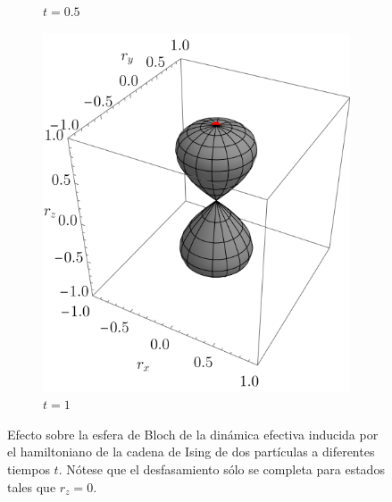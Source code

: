 \begin{figure}[ht!]
\begin{subfigure}{0.32\textwidth}
      \caption{$t=0.5$}
    \end{subfigure}
    \begin{subfigure}{0.32\textwidth}
      \centering
      \includegraphics[width=0.9\linewidth]{chapter3/figures_special/sphere_Ising_t=1._z=0.9_p=0.5.png}
      \caption{$t=1$}
    \end{subfigure}
    \caption{Efecto sobre la esfera de Bloch de la dinámica efectiva inducida por el hamiltoniano de la cadena de Ising de dos partículas a diferentes tiempos $t$. Nótese que el desfasamiento sólo se completa para estados tales que $r_{z}=0$.\label{fig:Ising_p0.5_Sequence}}
\end{figure}



